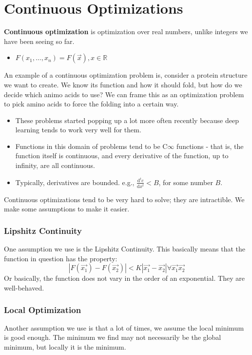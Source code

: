\documentclass[10pt]{article}
\newcommand{\dd}{\text{d}}
\begin{document}
\section*{Continuous Optimizations}
\textbf{Continuous optimization} is optimization over real numbers, unlike integers we have been seeing so far.
\begin{itemize}
	\item $F(x_1, \dots, x_n) = F(\vec{x}), x \in \mathbb{R}$
\end{itemize}
An example of a continuous optimization problem is, consider a protein structure we want to create.  We know its function and how it should fold, but how do we decide which animo acids to use?  We can frame this as an optimization problem to pick amino acids to force the folding into a certain way.
\begin{itemize}
	\item These problems started popping up a lot more often recently because deep learning tends to work very well for them.
	\item Functions in this domain of problems tend to be C$\infty$ functions - that is, the function itself is continuous, and every derivative of the function, up to infinity, are all continuous.
	\item Typically, derivatives are bounded.  e.g., $\frac{\dd^t c}{\dd x^t} < B$, for some number $B$.
\end{itemize}
Continuous optimizations tend to be very hard to solve; they are intractible.  We make some assumptions to make it easier.

\subsubsection*{Lipshitz Continuity}
One assumption we use is the Lipshitz Continuity.  This basically means that the function in question has the property:
\[|F(\vec{x_1}) - F(\vec{x_2})| < K|\vec{x_1} - \vec{x_2}| \forall \vec{x_1} \vec{x_2}\]
Or basically, the function does not vary in the order of an exponential.  They are well-behaved.

\subsubsection*{Local Optimization}
Another assumption we use is that a lot of times, we assume the local minimum is good enough.  The minimum we find may not necessarily be the global minimum, but locally it is the minimum.
\end{document}
